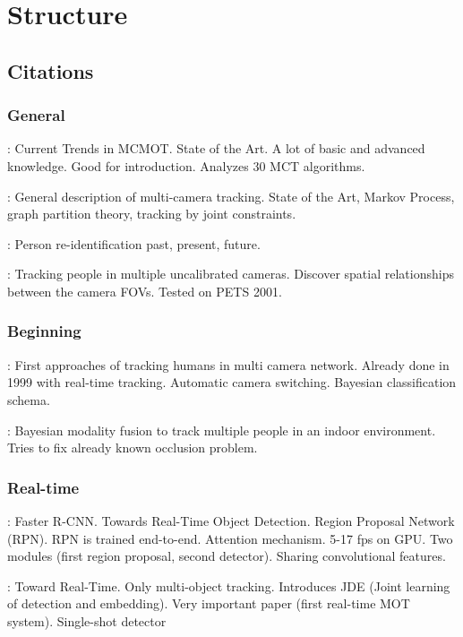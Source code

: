 \chapter{Structure}

\section{Citations}

\subsection{General}

\cite{Amosa23}: Current Trends in MCMOT. State of the Art. A lot of basic and advanced knowledge. Good for introduction. Analyzes 30 MCT algorithms.

\cite{Tian19}: General description of multi-camera tracking. State of the Art, Markov Process, graph partition theory, tracking by joint constraints.

\cite{Zheng16c}: Person re-identification past, present, future.

\cite{Khan01}: Tracking people in multiple uncalibrated cameras. Discover spatial relationships between the camera FOVs. Tested on PETS 2001.

\subsection{Beginning}

\cite{Cai99}: First approaches of tracking humans in multi camera network. Already done in 1999 with real-time tracking. Automatic camera switching. Bayesian classification schema.

\cite{Chang01}: Bayesian modality fusion to track multiple people in an indoor environment. Tries to fix already known occlusion problem.

\subsection{Real-time}

\cite{Ren17}: Faster R-CNN. Towards Real-Time Object Detection. Region Proposal Network (RPN). RPN is trained end-to-end. Attention mechanism. 5-17 fps on GPU. Two modules (first region proposal, second detector). Sharing convolutional features.

\cite{Wang20a}: Toward Real-Time. Only multi-object tracking. Introduces JDE (Joint learning of detection and embedding). Very important paper (first real-time MOT system). Single-shot detector

